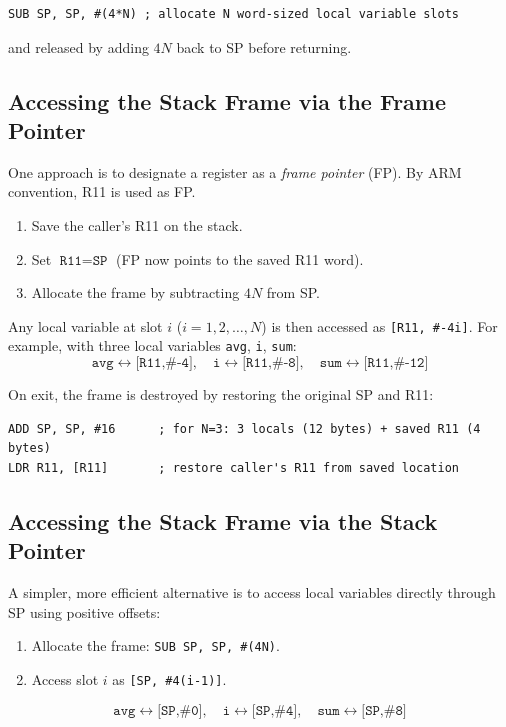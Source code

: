\documentclass[11pt, a4paper, notitlepage]{report}
\theoremstyle{definition}
\theoremstyle{remark}
\theoremstyle{definition}
\begin{document}
\begin{lstlisting}
SUB SP, SP, #(4*N) ; allocate N word-sized local variable slots
\end{lstlisting}

and released by adding $4N$ back to SP before returning.

\subsection{Accessing the Stack Frame via the Frame Pointer}

One approach is to designate a register as a \emph{frame pointer} (FP). By ARM convention, R11 is used as FP\@.

\begin{enumerate}
  \item Save the caller's R11 on the stack.
  \item Set $\texttt{R11} = \texttt{SP}$ (FP now points to the saved R11 word).
  \item Allocate the frame by subtracting $4N$ from SP\@.
\end{enumerate}

Any local variable at slot $i$ ($i = 1, 2, \ldots, N$) is then accessed as \texttt{[R11, \#-4i]}. For example, with three local variables \texttt{avg}, \texttt{i}, \texttt{sum}:
\[
  \texttt{avg} \leftrightarrow \texttt{[R11,\#-4]},\quad
  \texttt{i} \leftrightarrow \texttt{[R11,\#-8]},\quad
  \texttt{sum} \leftrightarrow \texttt{[R11,\#-12]}
\]

On exit, the frame is destroyed by restoring the original SP and R11:

\begin{lstlisting}
ADD SP, SP, #16      ; for N=3: 3 locals (12 bytes) + saved R11 (4 bytes)
LDR R11, [R11]       ; restore caller's R11 from saved location
\end{lstlisting}

\subsection{Accessing the Stack Frame via the Stack Pointer}

A simpler, more efficient alternative is to access local variables directly through SP using positive offsets:

\begin{enumerate}
  \item Allocate the frame: \texttt{SUB SP, SP, \#(4N)}.
  \item Access slot $i$ as \texttt{[SP, \#4(i-1)]}.
\end{enumerate}
\[
  \texttt{avg} \leftrightarrow \texttt{[SP,\#0]},\quad
  \texttt{i} \leftrightarrow \texttt{[SP,\#4]},\quad
  \texttt{sum} \leftrightarrow \texttt{[SP,\#8]}
\]
\end{document}
